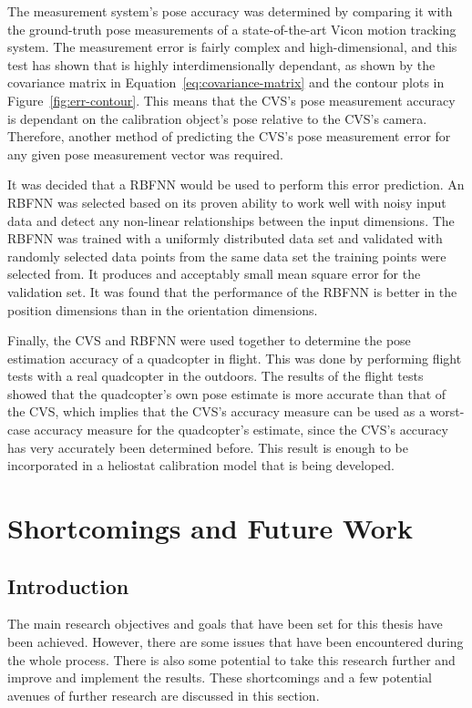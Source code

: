 The measurement system's pose accuracy was determined by comparing it with the ground-truth pose measurements of a state-of-the-art Vicon motion tracking system. The measurement error is fairly complex and high-dimensional, and this test has shown that is highly interdimensionally dependant, as shown by the covariance matrix in Equation~\ref{eq:covariance-matrix} and the contour plots in Figure~\ref{fig:err-contour}. This means that the CVS's pose measurement accuracy is dependant on the calibration object's pose relative to the CVS's camera. Therefore, another method of predicting the CVS's pose measurement error for any given pose measurement vector was required.

It was decided that a RBFNN would be used to perform this error prediction. An RBFNN was selected based on its proven ability to work well with noisy input data and detect any non-linear relationships between the input dimensions. The RBFNN was trained with a uniformly distributed data set and validated with randomly selected data points from the same data set the training points were selected from. It produces and acceptably small mean square error for the validation set. It was found that the performance of the RBFNN is better in the position dimensions than in the orientation dimensions. 

Finally, the CVS and RBFNN were used together to determine the pose estimation accuracy of a quadcopter in flight. This was done by performing flight tests with a real quadcopter in the outdoors. The results of the flight tests showed that the quadcopter's own pose estimate is more accurate than that of the CVS, which implies that the CVS's accuracy measure can be used as a worst-case accuracy measure for the quadcopter's estimate, since the CVS's accuracy has very accurately been determined before. This result is enough to be incorporated in a heliostat calibration model that is being developed. 

\section{Shortcomings and Future Work}

\subsection{Introduction}

The main research objectives and goals that have been set for this thesis have been achieved. However, there are some issues that have been encountered during the whole process. There is also some potential to take this research further and improve and implement the results. These shortcomings and a few potential avenues of further research are discussed in this section. 

